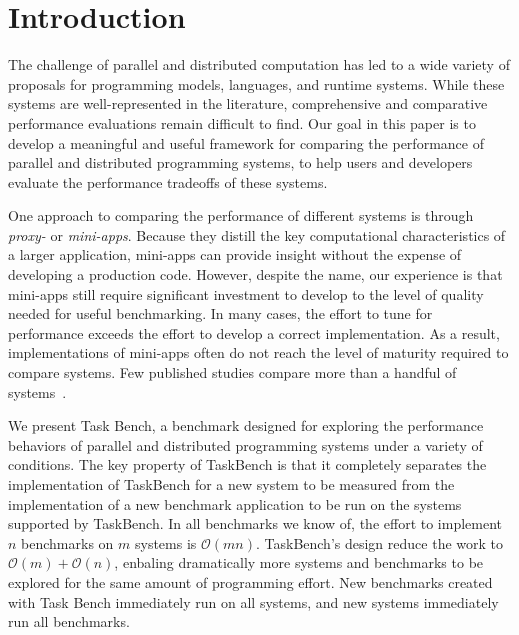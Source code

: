 \section{Introduction}
\label{sec:introduction}

The challenge of parallel and distributed computation has led to a
wide variety of proposals for programming models, languages, and
runtime systems. While these systems are well-represented in the literature, comprehensive and comparative performance evaluations
remain difficult to find. Our
goal in this paper is to develop a meaningful and useful framework for
comparing the performance of parallel and distributed programming
systems, to help users and developers evaluate the performance tradeoffs of these systems.

One approach to comparing the performance of different systems is through \emph{proxy-} or
\emph{mini-apps}. Because they distill the key computational characteristics of a larger
application, mini-apps can provide insight
without the expense of developing a production code. However, despite the name, our experience is that
mini-apps still require significant investment to develop
to the level of quality needed for useful benchmarking. In many cases,
the effort to tune for performance exceeds the effort to develop a correct implementation. As a result, implementations of mini-apps
often do not reach the level of maturity required to compare
systems. Few published studies compare more than a handful of systems~\cite{LULESH13}.

We present Task Bench, a benchmark designed for exploring the performance
behaviors of parallel and distributed programming systems under a
variety of conditions.  The key property of TaskBench is that it completely separates
the implementation of TaskBench for a new system to be measured from the implementation
of a new benchmark application to be run on the systems supported by TaskBench.
In all benchmarks we know of, the effort to implement $n$ benchmarks on $m$
systems is $\mathcal{O}(mn)$.  TaskBench's design reduce the work to $\mathcal{O}(m) + \mathcal{O}(n)$,
enbaling dramatically more systems and benchmarks to be explored for the same amount of programming
effort.  New benchmarks created with Task Bench
immediately run on all systems, and new systems immediately run all
benchmarks. 

